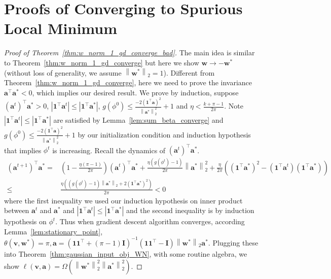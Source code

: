 \documentclass{article}
\newcommand{\firstlayer}{w}
\newcommand{\firstlayerWN}{v}
\newcommand{\secondlayer}{a}
\newcommand{\mat}[1]{\mathbf{#1}}
\newcommand{\vect}[1]{\mathbf{#1}}
\newcommand{\norm}[1]{\left\|#1\right\|}
\newcommand{\abs}[1]{\left|#1\right|}
\begin{document}
\section{Proofs of Converging to Spurious Local Minimum}
\label{sec:proof_local_min}
\begin{proof}[Proof of Theorem~\ref{thm:w_norm_1_gd_converge_bad}]
The main idea is similar to Theorem~\ref{thm:w_norm_1_gd_converge} but here we show $\vect{\firstlayer} \rightarrow -\vect{\firstlayer}^*$ (without loss of generality, we assume $\norm{\vect{\firstlayer}^*}_2 = 1$).
Different from Theorem~\ref{thm:w_norm_1_gd_converge}, here we need to prove the invariance $\vect{\secondlayer}^\top \vect{\secondlayer}^* < 0$, which implies our desired result.
We prove by induction, suppose  $\left(\vect{\secondlayer}^t\right)^\top \vect{\secondlayer}^* > 0$, 
$\abs{\vect{1}^\top\vect{\secondlayer}^t} \le \abs{\vect{1}^\top \vect{\secondlayer}^*}$, $g\left(\phi^0\right) \le  \frac{-2\left(\vect{1}^\top\vect{\secondlayer}\right)^2}{\norm{\vect{\secondlayer}^*}_2^2} + 1$ and $\eta < \frac{k+\pi-1}{2\pi}$.
Note $\abs{\vect{1}^\top\vect{\secondlayer}^t} \le \abs{\vect{1}^\top \vect{\secondlayer}^*}$ are satisfied by Lemma~\ref{lem:sum_beta_converge} and $g\left(\phi^0\right) \le  \frac{-2\left(\vect{1}^\top\vect{\secondlayer}\right)^2}{\norm{\vect{\secondlayer}^*}_2^2} + 1$ by our initialization condition and induction hypothesis that implies $\phi^t$ is increasing.
Recall the dynamics of $\left(\vect{\secondlayer}^t\right)^\top \vect{\secondlayer}^*$.
\begin{align*}
\left(\vect{\secondlayer}^{t+1}\right)^\top\vect{\secondlayer}^* = &\left(1-\frac{\eta\left(\pi-1\right)}{2\pi}\right)\left(\vect{\secondlayer}^t\right)^\top \vect{\secondlayer}^*  
+ \frac{\eta\left(g\left(\phi^t\right)-1\right)}{2\pi}\norm{\vect{\secondlayer}^*}_2^2 
+ \frac{\eta}{2\pi}\left(\left(\vect{1}^\top\vect{\secondlayer}^*\right)^2-\left(\vect{1}^\top\vect{\secondlayer}^t\right)\left(\vect{1}^\top\vect{\secondlayer}^*\right)\right) \\
\le & \frac{\eta\left(\left(g(\phi^t)-1\right)\norm{\vect{\secondlayer}^*}_2+2\left(\vect{1}^\top\vect{\secondlayer}^*\right)^2\right)}{2\pi} < 0
\end{align*}
where the first inequality we used our induction hypothesis on inner product between $\vect{\secondlayer}^t$ and $\vect{\secondlayer}^*$ and $\abs{\vect{1}^\top\vect{\secondlayer}^t} \le \abs{\vect{1}^\top \vect{\secondlayer}^*}$ and the second inequality is by induction hypothesis on $\phi^t$.
Thus when gradient descent algorithm converges, according Lemma~\ref{lem:stationary_point}, $\theta\left(\vect{\firstlayerWN},\vect{\firstlayer}^*\right) = \pi, \vect{\secondlayer} = \left(\vect{1}\vect{1}^\top + \left(\pi-1\right)\mat{I}\right)^{-1}\left(\vect{1}\vect{1}^\top - \mat{I}\right)\norm{\vect{\firstlayer}^*}_2\vect{\secondlayer}^*.$
Plugging these into Theorem~\ref{thm:gaussian_input_obj_WN}, with some routine algebra, we show $\ell\left(\vect{\firstlayerWN},\vect{\secondlayer}\right) = \Omega\left(\norm{\vect{\firstlayer}^*}_2^2\norm{\vect{\secondlayer}^*}_2^2\right)$.
\end{proof}
\end{document}
